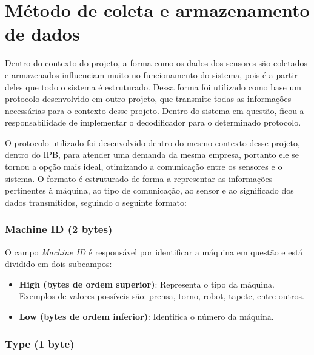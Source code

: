 \section[Método de coleta e armazenamento de dados]{Método de coleta e armazenamento de dados}

Dentro do contexto do projeto, a forma como os dados dos sensores são coletados e armazenados influenciam muito no funcionamento do sistema, pois é a partir deles que todo o sistema é estruturado. Dessa forma foi utilizado como base um protocolo desenvolvido em outro projeto, que transmite todas as informações necessárias para o contexto desse projeto. Dentro do sistema em questão, ficou a responsabilidade de implementar o decodificador para o determinado protocolo.

O protocolo utilizado foi desenvolvido dentro do mesmo contexto desse projeto, dentro do IPB, para atender uma demanda da mesma empresa, portanto ele se tornou a opção mais ideal, otimizando a comunicação entre os sensores e o sistema. O formato é estruturado de forma a representar as informações pertinentes à máquina, ao tipo de comunicação, ao sensor e ao significado dos dados transmitidos, seguindo o seguinte formato:

\subsubsection{Machine ID (2 bytes)}

O campo \textit{Machine ID} é responsável por identificar a máquina em questão e está dividido em dois subcampos:

\begin{itemize}
    \item \textbf{High (bytes de ordem superior)}: Representa o tipo da máquina. Exemplos de valores possíveis são: prensa, torno, robot, tapete, entre outros.
    \item \textbf{Low (bytes de ordem inferior)}: Identifica o número da máquina.
\end{itemize}

\subsubsection{Type (1 byte)}


